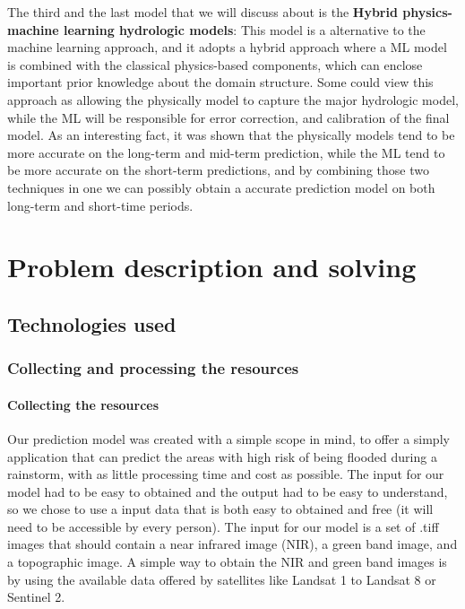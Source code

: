 \documentclass[12pt, a4paper]{report}
\begin{document}
The third and the last model that we will discuss about is the \textbf{Hybrid physics-machine learning hydrologic models}: This model is a alternative to the machine learning approach, and it adopts a hybrid approach where a ML model is combined with the classical physics-based components, which can enclose important prior knowledge about the domain structure. Some could view this approach as allowing the physically model to capture the major hydrologic  model, while the ML will be responsible for error correction, and calibration of the final model. As an interesting fact, it was shown that the physically models tend to be more accurate on the long-term and mid-term prediction, while the ML tend to be more accurate on the short-term predictions, and by combining those two techniques in one we can possibly obtain a accurate prediction model on both long-term and short-time periods.



\newpage{}


\chapter{Problem description and solving}

\section{Technologies used}

\subsection{Collecting and processing the resources}

\subsubsection{Collecting the resources}

\quad
Our prediction model was created with a simple scope in mind, to offer a simply  application that can predict the areas with high risk of being flooded during a rainstorm, with as little processing time and cost as possible. The input for our model had to be easy to obtained and the output had to be easy to understand, so we chose to use a input data that is both easy to obtained and free (it will need to be accessible by every person). The input for our model is a set of .tiff images that should contain a near infrared image (NIR), a green band image, and a topographic image. A simple way to obtain the NIR and green band images is by using the available data offered by satellites like Landsat 1 to Landsat 8 or Sentinel 2. 
\end{document}
